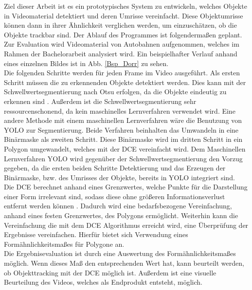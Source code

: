 {Ziel dieser Arbeit ist es ein prototypisches System zu entwickeln, welches Objekte in Videomaterial detektiert und deren Umrisse vereinfacht. Diese Objektumrisse können dann in ihrer Ähnlichkeit verglichen werden, um einzuschätzen, ob die Objekte trackbar sind. Der Ablauf des Programmes ist folgendermaßen geplant. \\ 
Zur Evaluation wird Videomaterial von Autobahnen aufgenommen, welches im Rahmen der Bachelorarbeit analysiert wird. Ein beispielhafter Verlauf anhand eines einzelnen Bildes ist in Abb. \ref{Bsp_Dorr} zu sehen. \\
Die folgenden Schritte werden für jeden Frame im Video ausgeführt. 
Als ersten Schritt müssen die zu erkennenden Objekte detektiert werden. Dies kann mit der Schwellwertsegmentierung nach Otsu erfolgen, da die Objekte eindeutig zu erkennen sind \citep{Otsu1979}. Außerdem ist die Schwellwertsegmentierung sehr ressourcenschonend, da kein maschinelles Lernverfahren verwendet wird. Eine andere Methode mit einem maschinellen Lernverfahren wäre die Benutzung von YOLO zur Segmentierung. Beide Verfahren beinhalten das Umwandeln in eine Binärmaske als zweiten Schritt. Diese Binärmaske wird im dritten Schritt in ein Polygon umgewandelt, welches mit der DCE vereinfacht wird. Dem Maschinellen Lernverfahren YOLO wird gegenüber der Schwellwertsegmentierung den Vorzug gegeben, da die ersten beiden Schritte Detektierung und das Erzeugen der Binärmaske, bzw. des Umrisses der Objekte, bereits in YOLO integriert sind.\\
Die DCE berechnet anhand eines Grenzwertes, welche Punkte für die Darstellung einer Form irrelevant sind, sodass diese ohne größeren Informationsverlust entfernt werden können \citep{Barkowsky2000}. Dadurch wird eine bedarfsbezogene Vereinfachung, anhand eines festen Grenzwertes, des Polygons ermöglicht. 
Weiterhin kann die Vereinfachung die mit dem DCE Algorithmus erreicht wird, eine Überprüfung der Ergebnisse vereinfachen. Hierfür bietet sich Verwendung eines Formähnlichkeitsmaßes für Polygone an. \\
Die Ergebnisevaluation ist durch eine Auswertung des Formähnlichkeitsmaßes möglich. Wenn dieses Maß den entsprechenden Wert hat, kann beurteilt werden, ob Objekttracking mit der DCE möglich ist. Außerdem ist eine visuelle Beurteilung des Videos, welches als Endprodukt entsteht, möglich.\\}
